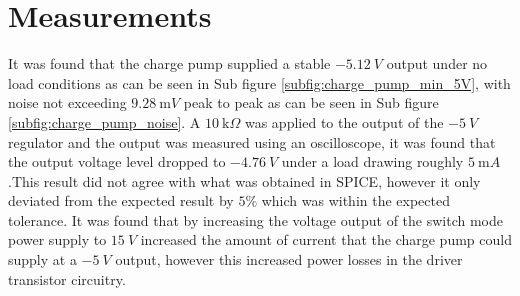 \section{Measurements} \label{sec:measurements_chargepump}
It was found that the charge pump supplied a stable $\SI{-5.12}{V}$ output under no load conditions as can be seen in Sub figure \ref{subfig:charge_pump_min_5V}, with noise not exceeding $\SI{9.28}{\milli V}$ peak to peak as can be seen in Sub figure \ref{subfig:charge_pump_noise}. A $\SI{10}{\kilo \Omega}$ was applied to the output of the $\SI{-5}{V}$ regulator and the output was measured using an oscilloscope, it was found that the output voltage level dropped to $\SI{-4.76}{V}$ under a load drawing roughly $\SI{5}{\milli A}$.\newline This result did not agree with what was obtained in SPICE, however it only deviated from the expected result by $5\%$ which was within the expected tolerance. It was found that by increasing the voltage output of the switch mode power supply to $\SI{15}{V}$ increased the amount of current that the charge pump could supply at a $\SI{-5}{V}$ output, however this increased power losses in the driver transistor circuitry.

